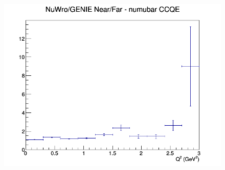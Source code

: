 \documentclass[12pt]{article}
\begin{document}
\begin{figure}[h]
\endminipage
{}
\includegraphics[width=\linewidth]{eff_Q2/FGT/ratios/CCQE_NuWro_GENIE_numubar_NF_Q2.png}
\endminipage
\newline
\end{figure}
\clearpage
\end{document}
